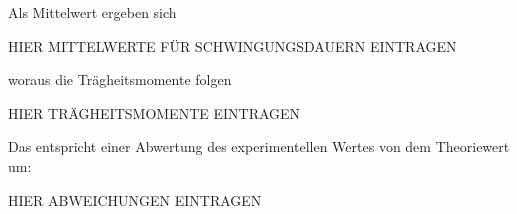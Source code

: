 Als Mittelwert ergeben sich
\begin{center}
  HIER MITTELWERTE FÜR SCHWINGUNGSDAUERN EINTRAGEN
\end{center}

woraus die Trägheitsmomente folgen %
\begin{center}
  HIER TRÄGHEITSMOMENTE EINTRAGEN
\end{center}

Das entspricht einer Abwertung des experimentellen Wertes von dem Theoriewert um:
\begin{center}
  HIER ABWEICHUNGEN EINTRAGEN
\end{center}

